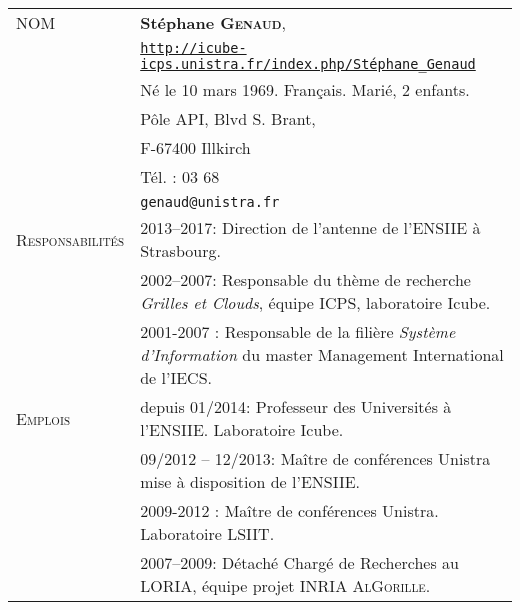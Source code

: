 
\setlength{\tabcolsep}{5pt}
\noindent
\begin{tabular}{lp{13.7cm}}
\textsc{NOM}		&{\bf Stéphane \textsc{Genaud}}, \\
					  & \texttt{\url{http://icube-icps.unistra.fr/index.php/Stéphane\_Genaud}}\\
				& Né le 10 mars 1969. Français. Marié, 2 enfants. \\
				  & Pôle API, Blvd S. Brant,\\
				  & F-67400 Illkirch\\
				  & Tél. : 03 68 \\ 
				 & \texttt{genaud@unistra.fr}\\[5mm]
\hline
\textsc{Responsabilités} & 2013--2017: Direction de l'antenne de l'ENSIIE à Strasbourg.\\[2mm]
				 & 2002--2007: Responsable du thème de recherche \textit{Grilles et Clouds}, équipe ICPS, laboratoire Icube.\\[2mm]
				 & 2001-2007 : Responsable de la filière \textit{Système d'Information} du master Management International de l'IECS.\\[2mm]

\hline
\textsc{Emplois} 		& depuis 01/2014: Professeur des Universités à l'ENSIIE. Laboratoire Icube.\\
				& 09/2012 -- 12/2013: Maître de conférences Unistra mise à disposition de l'ENSIIE.\\[2mm]
			      & 2009-2012 : Maître de conférences Unistra. Laboratoire LSIIT.\\[2mm]
 	                  & 2007--2009: Détaché Chargé de Recherches au LORIA, équipe projet INRIA \textsc{AlGorille}.\\[2mm]


\end{tabular}
